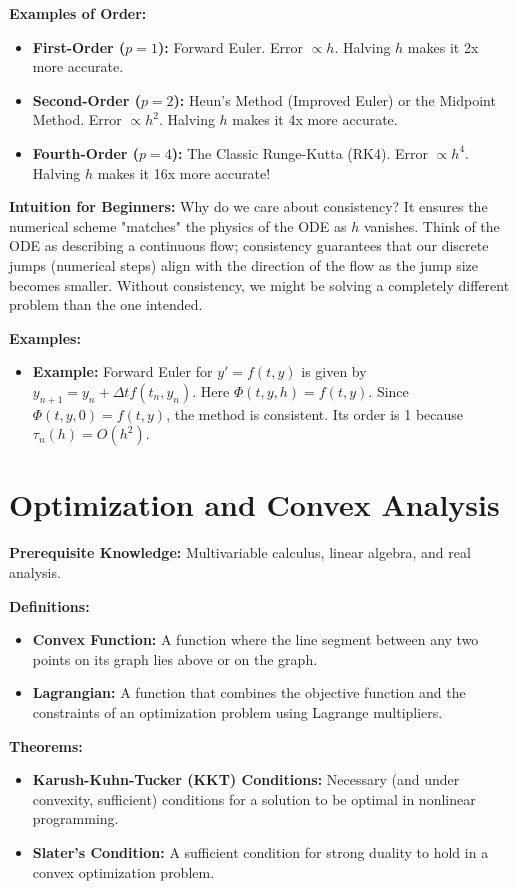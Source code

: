 \textbf{Examples of Order:}
\begin{itemize}
    \item \textbf{First-Order ($p=1$):} Forward Euler. Error $\propto h$. Halving $h$ makes it 2x more accurate.
    \item \textbf{Second-Order ($p=2$):} Heun's Method (Improved Euler) or the Midpoint Method. Error $\propto h^2$. Halving $h$ makes it 4x more accurate.
    \item \textbf{Fourth-Order ($p=4$):} The Classic Runge-Kutta (RK4). Error $\propto h^4$. Halving $h$ makes it 16x more accurate!
\end{itemize}

\textbf{Intuition for Beginners:} 
Why do we care about consistency? It ensures the numerical scheme "matches" the physics of the ODE as $h$ vanishes. Think of the ODE as describing a continuous flow; consistency guarantees that our discrete jumps (numerical steps) align with the direction of the flow as the jump size becomes smaller. Without consistency, we might be solving a completely different problem than the one intended.

\textbf{Examples:}
\begin{itemize}
    \item \textbf{Example:} Forward Euler for $y' = f(t,y)$ is given by $y_{n+1} = y_n + \Delta t f(t_n, y_n)$. Here $\Phi(t, y, h) = f(t, y)$. Since $\Phi(t, y, 0) = f(t, y)$, the method is consistent. Its order is 1 because $\tau_n(h) = O(h^2)$.
\end{itemize}


\section{Optimization and Convex Analysis}
\textbf{Prerequisite Knowledge:} Multivariable calculus, linear algebra, and real analysis.

\textbf{Definitions:}
\begin{itemize}
    \item \textbf{Convex Function:} A function where the line segment between any two points on its graph lies above or on the graph.
    \item \textbf{Lagrangian:} A function that combines the objective function and the constraints of an optimization problem using Lagrange multipliers.
\end{itemize}

\textbf{Theorems:}
\begin{itemize}
    \item \textbf{Karush-Kuhn-Tucker (KKT) Conditions:} Necessary (and under convexity, sufficient) conditions for a solution to be optimal in nonlinear programming.
    \item \textbf{Slater's Condition:} A sufficient condition for strong duality to hold in a convex optimization problem.
\end{itemize}

